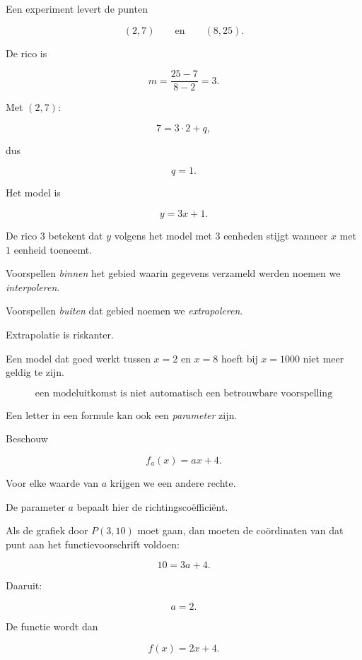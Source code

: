\documentclass{ximera}
\begin{document}
\begin{voorbeeld}
Een experiment levert de punten

\[
(2,7)
\qquad\text{en}\qquad
(8,25).
\]

De rico is

\[
m
=
\frac{25-7}{8-2}
=
3.
\]

Met \((2,7)\):

\[
7=3\cdot2+q,
\]

dus

\[
q=1.
\]

Het model is

\[
\boxed{y=3x+1}.
\]

De rico \(3\) betekent dat \(y\) volgens het model met \(3\) eenheden stijgt
wanneer \(x\) met \(1\) eenheid toeneemt.
\end{voorbeeld}



Voorspellen \emph{binnen} het gebied waarin gegevens verzameld werden noemen we
\emph{interpoleren}.

Voorspellen \emph{buiten} dat gebied noemen we \emph{extrapoleren}.

Extrapolatie is riskanter.

Een model dat goed werkt tussen \(x=2\) en \(x=8\) hoeft bij \(x=1000\)
niet meer geldig te zijn.

\[
\boxed{
\text{een modeluitkomst is niet automatisch een betrouwbare voorspelling}
}
\]



Een letter in een formule kan ook een \emph{parameter} zijn.

Beschouw

\[
f_a(x)=ax+4.
\]

Voor elke waarde van \(a\) krijgen we een andere rechte.

De parameter \(a\) bepaalt hier de richtingscoëfficiënt.

Als de grafiek door \(P(3,10)\) moet gaan, dan moeten de coördinaten van dat punt
aan het functievoorschrift voldoen:

\[
10=3a+4.
\]

Daaruit:

\[
a=2.
\]

De functie wordt dan

\[
f(x)=2x+4.
\]
\end{document}
